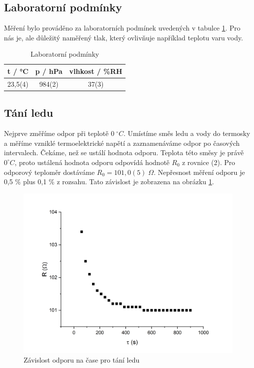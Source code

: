 \subsection{Laboratorní podmínky}

    Měření bylo prováděno za laboratorních podmínek uvedených v tabulce \ref{tab:lab_pod}. Pro nás je, ale důležitý naměřený tlak, který ovlivňuje například teplotu varu vody.

    \begin{table}[h]
        \centering
        \begin{tabular}{|c|c|c|} 
        \hline
            t / °C & p / hPa & vlhkost / \%RH  \\ 
        \hline
            23,5(4)   & 984(2)   & 37(3)            \\
        \hline
        \end{tabular}
        \caption{Laboratorní podmínky}
        \label{tab:lab_pod}
    \end{table}

\subsection{Tání ledu}
Nejprve změříme odpor při teplotě $0 \; ^\circ C$. Umístíme směs ledu a vody do termosky a měříme vzniklé termoelektrické napětí a zaznamenáváme odpor po časových intervalech. Čekáme, než se ustálí hodnota odporu. Teplota této směsy je právě $0 ^\circ C$, proto ustálená hodnota odporu odpovídá hodnotě $R_0$ z rovnice (2). Pro odporový teploměr dostáváme $R_0 = 101,0(5) \; \Omega$. Nepřesnost měření odporu je 0,5 \% plus 0,1 \% z rozsahu. Tato závislost je zobrazena na obrázku \ref{fig:odpor-na-teplote-led}.

\begin{figure}[h]
    \centering
    \includegraphics[width=0.5\linewidth]{8 - Kalibrace odporového teploměru a termočlánku//Prototkol - kalibrace teploměru//img/Závislost R na t, tání ledu.png}
    \caption{Závislost odporu na čase pro tání ledu}
    \label{fig:odpor-na-teplote-led}
\end{figure}

